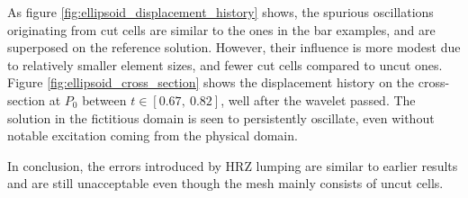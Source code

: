 As figure \ref{fig:ellipsoid_displacement_history} shows, the spurious oscillations originating from cut cells are similar to the ones in the bar examples, and are superposed on the reference solution. However, their influence is more modest due to relatively smaller element sizes, and fewer cut cells compared to uncut ones. Figure \ref{fig:ellipsoid_cross_section} shows the displacement history on the cross-section at $P_0$ between $t \in [0.67, \ 0.82]$, well after the wavelet passed. The solution in the fictitious domain is seen to persistently oscillate, even without notable excitation coming from the physical domain.

In conclusion, the errors introduced by HRZ lumping are similar to earlier results and are still unacceptable even though the mesh mainly consists of uncut cells.

